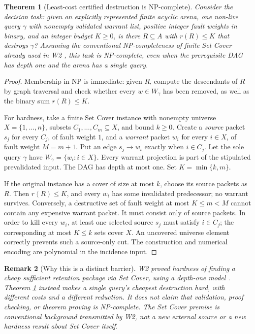 \documentclass[11pt,letterpaper]{article}
\newtheorem{theorem}{Theorem}[section]
\newtheorem{remark}[theorem]{Remark}
\begin{document}
\begin{theorem}[Least-cost certified destruction is NP-complete]\label{thm:hardness}
Consider the decision task: given an explicitly represented finite acyclic arena, one non-live query $\gamma$ with nonempty validated warrant list, positive integer fault weights in binary, and an integer budget $K\ge0$, is there $R\subseteq A$ with $r(R)\le K$ that destroys $\gamma$? Assuming the conventional NP-completeness of finite Set Cover already used in W2 \cite{W2}, this task is NP-complete, even when the prerequisite DAG has depth one and the arena has a single query.
\end{theorem}
\begin{proof}
Membership in NP is immediate: given $R$, compute the descendants of $R$ by graph traversal and check whether every $w\in W_\gamma$ has been removed, as well as the binary sum $r(R)\le K$.

For hardness, take a finite Set Cover instance with nonempty universe $X=\{1,\ldots,n\}$, subsets $C_1,\ldots,C_m\subseteq X$, and bound $k\ge0$. Create a \emph{source} packet $s_j$ for every $C_j$, of fault weight $1$, and a \emph{warrant} packet $w_i$ for every $i\in X$, of fault weight $M=m+1$. Put an edge $s_j\to w_i$ exactly when $i\in C_j$. Let the sole query $\gamma$ have $W_\gamma=\{w_i:i\in X\}$. Every warrant projection is part of the stipulated prevalidated input. The DAG has depth at most one. Set $K=\min\{k,m\}$.

If the original instance has a cover of size at most $k$, choose its source packets as $R$. Then $r(R)\le K$, and every $w_i$ has some invalidated predecessor; no warrant survives. Conversely, a destructive set of fault weight at most $K\le m<M$ cannot contain any expensive warrant packet. It must consist only of source packets. In order to kill every $w_i$, at least one selected source $s_j$ must satisfy $i\in C_j$; the corresponding at most $K\le k$ sets cover $X$. An uncovered universe element correctly prevents such a source-only cut. The construction and numerical encoding are polynomial in the incidence input.
\end{proof}

\begin{remark}[Why this is a distinct barrier]
W2 proved hardness of finding a \emph{cheap sufficient retention package} via Set Cover, using a depth-one model \cite{W2}. Theorem \ref{thm:hardness} instead makes a \emph{single query}\!'s cheapest \emph{destruction} hard, with different costs and a different reduction. It does not claim that validation, proof checking, or theorem proving is NP-complete. The Set Cover premise is conventional background transmitted by W2, not a new external source or a new hardness result about Set Cover itself.
\end{remark}
\end{document}

